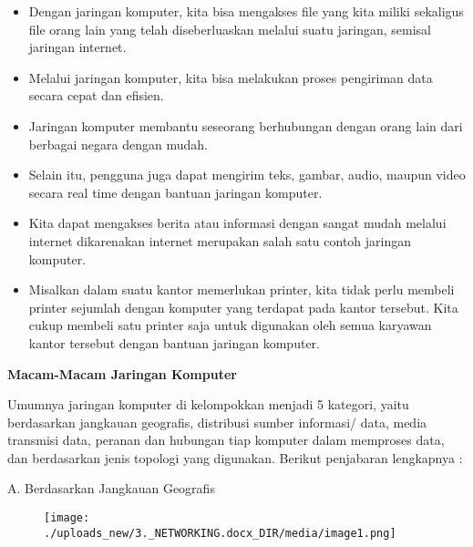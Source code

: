 \documentclass[a4paper,12pt]{report}
\begin{document}
\begin{itemize}
\item Dengan jaringan komputer, kita bisa mengakses file yang kita miliki sekaligus file orang lain yang telah diseberluaskan melalui suatu jaringan, semisal jaringan internet. \par
\noindent 
\item Melalui jaringan komputer, kita bisa melakukan proses pengiriman data secara cepat dan efisien. \par
\noindent 
\item Jaringan komputer membantu seseorang berhubungan dengan orang lain dari berbagai negara dengan mudah. \par
\noindent 
\item Selain itu, pengguna juga dapat mengirim teks, gambar, audio, maupun video secara real time dengan bantuan jaringan komputer. \par
\noindent 
\item Kita dapat mengakses berita atau informasi dengan sangat mudah melalui internet dikarenakan internet merupakan salah satu contoh jaringan komputer. \par
\noindent 
\item Misalkan dalam suatu kantor memerlukan printer, kita tidak perlu membeli printer sejumlah dengan komputer yang terdapat pada kantor tersebut. Kita cukup membeli satu printer saja untuk digunakan oleh semua karyawan kantor tersebut dengan bantuan jaringan komputer.\end{itemize}
 \par
\vspace{12pt}
\noindent 
\textbf{Macam-Macam Jaringan Komputer} \par
Umumnya jaringan komputer di kelompokkan menjadi 5 kategori, yaitu berdasarkan jangkauan geografis, distribusi sumber informasi/ data, media transmisi data, peranan dan hubungan tiap komputer dalam memproses data, dan berdasarkan jenis topologi yang digunakan. Berikut penjabaran lengkapnya : \par
\vspace{12pt}
\noindent 
A. Berdasarkan Jangkauan Geografis \par
\noindent 
\begin{center}



\begin{figure}[H]
\begin{center}
\texttt{[image: ./uploads\_new/3.\_NETWORKING.docx\_DIR/media/image1.png]}
\end{center}
\end{figure}




\end{center}\vspace{12pt}
\end{document}
